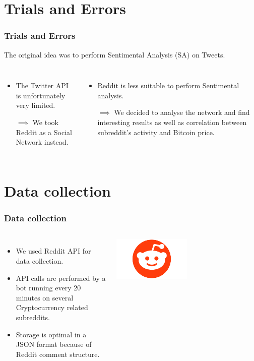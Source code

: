 \documentclass[aspectratio=169]{beamer}
\begin{document}
\section{Trials and Errors}
\begin{frame}[t]
    \frametitle{Trials and Errors}
    The original idea was to perform Sentimental Analysis (SA) on Tweets.
    \vspace{2.0cm}
    \begin{columns}
        \begin{itemize}
            \item The Twitter API is unfortunately very limited.
            \item[$\implies$] We took Reddit as a Social Network instead.
        \end{itemize}
        \begin{itemize}
            \item Reddit is less suitable to perform Sentimental analysis.
            \item[$\implies$] We decided to analyse the network and find interesting results as well as correlation between subreddit's activity and Bitcoin price.
        \end{itemize}

    \end{columns}
\end{frame}
\section{Data collection}
\begin{frame}[t]
    \frametitle{Data collection}
    \vspace{1.0cm}
    \begin{columns}
        \begin{itemize}
            \item We used Reddit API for data collection.
            \item API calls are performed by a bot running every 20 minutes on several Cryptocurrency related subreddits.
            \item Storage is optimal in a JSON format because of Reddit comment structure.
        \end{itemize}
        \hspace{1.0cm}
        \includegraphics[width=0.5\textwidth]{figures/reddit_logo.png}
    \end{columns}
\end{frame}
\end{document}
